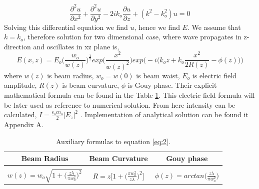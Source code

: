 \documentclass[a4paper]{article}
\begin{document}
	\begin{equation}\label{eq:1}
	\frac{\partial^2 u}{\partial x^2}+ \frac{\partial^2 u}{\partial y^2} - 2ik_o\frac{\partial u}{\partial z}+(k^2-k_o^2)u=0
	\end{equation}
	Solving this differential equation we find $u$, hence we find $E$. We assume that $k = k_o$, therefore solution for two dimensional case, where wave propagates in z-direction and oscillates in xz plane is,
	\begin{equation}\label{eq:2}
	E(x,z)=E_o\bigg(\frac{w_o}{w(z)}\bigg)^{\frac{1}{2}}exp\bigg(\frac{x^2}{w(z)^2}\bigg)exp\bigg(-i\Big(k_oz+k_o\frac{x^2}{2R(z)}-\phi(z)\Big)\bigg)
	\end{equation}
	where $w(z)$ is beam radius, $w_o = w(0)$ is beam waist, $E_o$ is electric field amplitude, $R(z)$ is beam curvature, $\phi$ is Gouy phase. Their explicit mathematical formula can be found in the Table \ref{tab:Table1}. This electric field formula will be later used as reference to numerical solution. From here intensity can be calculated, $I = \frac{\epsilon _o c n_o}{2}|E_z|^2$ \cite{link1}. Implementation of analytical solution can be found it Appendix A. 
	

	\begin{table}[h!]
		\begin{center}
			\begin{tabular}{c| c| c} %
				\textbf{Beam Radius} & \textbf{Beam Curvature} & \textbf{Gouy phase}\\
				\hline
				&&\\
				$w(z)= w_o\sqrt{1+\Big(\frac{z\lambda}{\pi w_o^2}\Big)^2}$ & $R=z\bigg[1+\Big(\frac{\pi w_o^2}{z\lambda}\Big)^2\bigg]$ & $\phi(z)=arctan\Big(\frac{z\lambda}{\pi w_o^2}\Big)$\\
			\end{tabular}
			\caption{\label{tab:Table1} Auxiliary formulas to equation \ref{eq:2}.}
		\end{center}
	\end{table}
	
\end{document}
